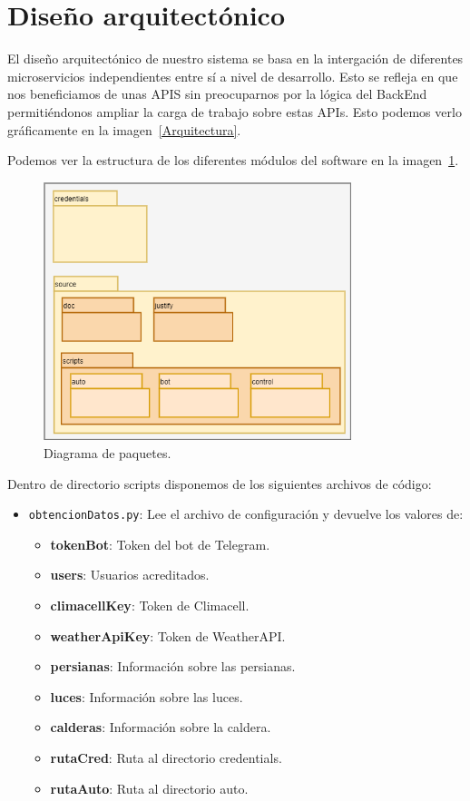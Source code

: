 \section{Diseño arquitectónico}

El diseño arquitectónico de nuestro sistema se basa en la intergación de diferentes microservicios independientes entre sí a nivel de desarrollo. Esto se refleja en que nos beneficiamos de unas APIS sin preocuparnos por la lógica del BackEnd permitiéndonos ampliar la carga de trabajo sobre estas APIs. Esto podemos verlo gráficamente en la imagen~\ref{Arquitectura}.

Podemos ver la estructura de los diferentes módulos del software en la imagen~\ref{Paquetes}.

\begin{figure}[h]
\centering
\includegraphics[width=0.8\textwidth]{img/Diagramas/Diagrama de paquetes.png}
\caption{Diagrama de paquetes.}\label{Paquetes}
\end{figure}

Dentro de directorio scripts disponemos de los siguientes archivos de código:
\begin{itemize}
    \item \texttt{obtencionDatos.py}: Lee el archivo de configuración y devuelve los valores de:
    \begin{itemize}
        \item \textbf{tokenBot}: Token del bot de Telegram.
        \item \textbf{users}: Usuarios acreditados.
        \item \textbf{climacellKey}: Token de Climacell.
        \item \textbf{weatherApiKey}: Token de WeatherAPI.
        \item \textbf{persianas}: Información sobre las persianas.
        \item \textbf{luces}: Información sobre las luces.
        \item \textbf{calderas}: Información sobre la caldera.
        \item \textbf{rutaCred}: Ruta al directorio credentials.
        \item \textbf{rutaAuto}: Ruta al directorio auto.
    \end{itemize}
\end{itemize}


